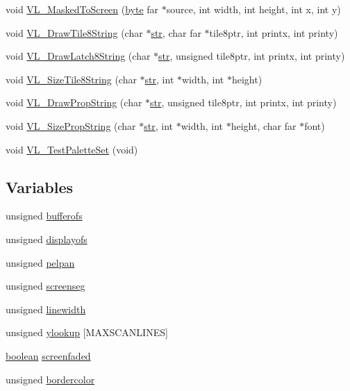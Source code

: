 \begin{DoxyCompactItemize}
\item 
void \hyperlink{ID__VL_8H_a1ac9dd60b620514ade73c12fe349b913}{VL\_\-MaskedToScreen} (\hyperlink{ID__HEAD_8H_a0c8186d9b9b7880309c27230bbb5e69d}{byte} far $\ast$source, int width, int height, int x, int y)
\item 
void \hyperlink{ID__VL_8H_aba3f9a475bb578429bdc03681f9c14de}{VL\_\-DrawTile8String} (char $\ast$\hyperlink{WL__MAIN_8C_aaa970ecb4bbdf1eeaf97691045aaf8b5}{str}, char far $\ast$tile8ptr, int printx, int printy)
\item 
void \hyperlink{ID__VL_8H_a9680287be27cd138b273267d21bdb148}{VL\_\-DrawLatch8String} (char $\ast$\hyperlink{WL__MAIN_8C_aaa970ecb4bbdf1eeaf97691045aaf8b5}{str}, unsigned tile8ptr, int printx, int printy)
\item 
void \hyperlink{ID__VL_8H_af01da85944467c664d21473141c74977}{VL\_\-SizeTile8String} (char $\ast$\hyperlink{WL__MAIN_8C_aaa970ecb4bbdf1eeaf97691045aaf8b5}{str}, int $\ast$width, int $\ast$height)
\item 
void \hyperlink{ID__VL_8H_a7809fdb2d43255c52a3d13d625c4081f}{VL\_\-DrawPropString} (char $\ast$\hyperlink{WL__MAIN_8C_aaa970ecb4bbdf1eeaf97691045aaf8b5}{str}, unsigned tile8ptr, int printx, int printy)
\item 
void \hyperlink{ID__VL_8H_a055159934680670386dfbf76314f69ec}{VL\_\-SizePropString} (char $\ast$\hyperlink{WL__MAIN_8C_aaa970ecb4bbdf1eeaf97691045aaf8b5}{str}, int $\ast$width, int $\ast$height, char far $\ast$font)
\item 
void \hyperlink{ID__VL_8H_a29a9e236524d106d97e319b43ade47fa}{VL\_\-TestPaletteSet} (void)
\end{DoxyCompactItemize}
\subsection*{Variables}
\begin{DoxyCompactItemize}
\item 
unsigned \hyperlink{ID__VL_8H_a95b7c90690730f0b09409f1fb8ef3730}{bufferofs}
\item 
unsigned \hyperlink{ID__VL_8H_ae69449df2121a068cc86de491d7b5956}{displayofs}
\item 
unsigned \hyperlink{ID__VL_8H_a868e53c86d5ef1ddae46b80290a36cd8}{pelpan}
\item 
unsigned \hyperlink{ID__VL_8H_af6fb80e1232b0b5c33e4174a5b7c7985}{screenseg}
\item 
unsigned \hyperlink{ID__VL_8H_a4290871866270ef6854fb238a3c8698d}{linewidth}
\item 
unsigned \hyperlink{ID__VL_8H_ab3bdd072ceebbac1d50e74d7c34e9c4a}{ylookup} \mbox{[}MAXSCANLINES\mbox{]}
\item 
\hyperlink{ID__HEAD_8H_a7c6368b321bd9acd0149b030bb8275ed}{boolean} \hyperlink{ID__VL_8H_a81e1545cb2fb150263b44e54eee49451}{screenfaded}
\item 
unsigned \hyperlink{ID__VL_8H_a7d243f7a427ebc7df3533c0cd5760971}{bordercolor}
\end{DoxyCompactItemize}


